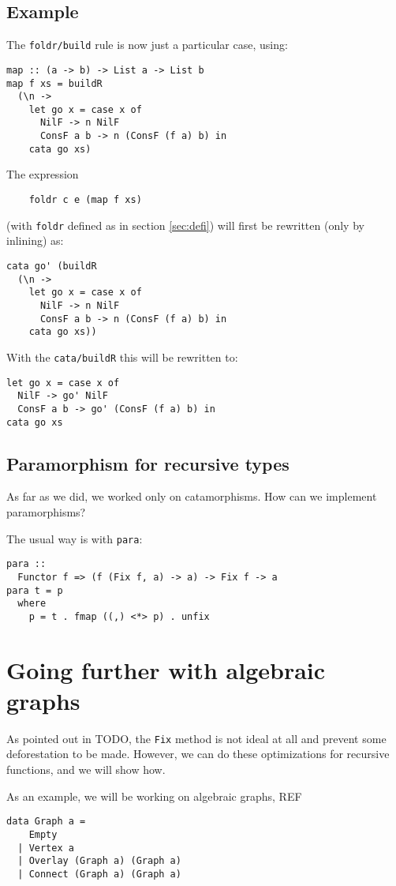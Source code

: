 \documentclass[format=sigplan]{acmart}
\newcommand{\minline}[1]{\texttt{#1}}
\begin{document}
\subsection{Example}
The \verb|foldr/build| rule is now just a particular case, using:
\begin{verbatim}
map :: (a -> b) -> List a -> List b
map f xs = buildR 
  (\n ->
    let go x = case x of
      NilF -> n NilF
      ConsF a b -> n (ConsF (f a) b) in
    cata go xs)
\end{verbatim}

The expression
\begin{verbatim}
	foldr c e (map f xs)
\end{verbatim}
(with \minline{foldr} defined as in section \ref{sec:defi}) will first be rewritten (only by inlining) as:
\begin{verbatim}
cata go' (buildR 
  (\n ->
    let go x = case x of
      NilF -> n NilF
      ConsF a b -> n (ConsF (f a) b) in
    cata go xs))
\end{verbatim}

With the \verb|cata/buildR| this will be rewritten to:
\begin{verbatim}
let go x = case x of
  NilF -> go' NilF
  ConsF a b -> go' (ConsF (f a) b) in
cata go xs
\end{verbatim}

\subsection{Paramorphism for recursive types}
\label{sec:para-rec}
As far as we did, we worked only on catamorphisms. How can we implement paramorphisms?

The usual way is with \minline{para}:
\begin{verbatim}
para ::
  Functor f => (f (Fix f, a) -> a) -> Fix f -> a
para t = p
  where
    p = t . fmap ((,) <*> p) . unfix
\end{verbatim}

\section{Going further with algebraic graphs}
As pointed out in TODO, the \verb|Fix| method is not ideal at all and prevent some deforestation to be made.
However, we can do these optimizations for recursive functions, and we will show how.

As an example, we will be working on algebraic graphs, REF
\begin{verbatim}
data Graph a =
    Empty
  | Vertex a
  | Overlay (Graph a) (Graph a)
  | Connect (Graph a) (Graph a)
\end{verbatim}
\end{document}
